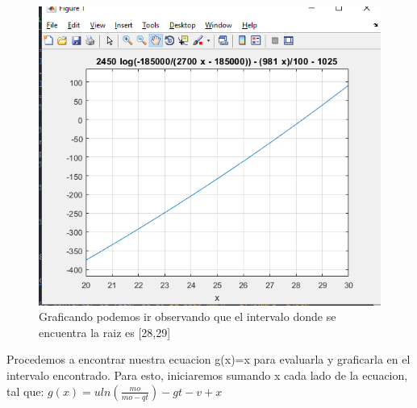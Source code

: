 \documentclass{article}
\theoremstyle{mytheoremstyle}
\theoremstyle{mytheoremstyle}
\theoremstyle{myproblemstyle}
\begin{document}
    \begin{figure}[ht]
        \includegraphics[scale=0.5]{img/stf28_2.png}{\\Graficando podemos ir observando que el intervalo donde se encuentra la raiz es [28,29]}
    \end{figure}
    \pagebreak
    \noindent Procedemos a encontrar nuestra ecuacion g(x)=x para evaluarla y graficarla en el intervalo encontrado.
Para esto, iniciaremos sumando x cada lado de la ecuacion, tal que:
$g(x)=uln(\frac{mo}{mo-qt})-gt-v+x$
\end{document}
